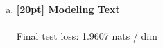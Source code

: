 \documentclass{article}
\begin{document}
\newpage
{}

\begin{enumerate}[(a)]
\item {\bf [20pt] Modeling Text} \\\\
Final test loss: 1.9607 nats / dim
\begin{figure}[H]
    \centering
\end{figure}

\begin{figure}[H]
    \centering
\end{figure}


\end{enumerate}
\end{document}
